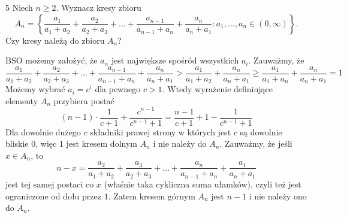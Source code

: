 \documentclass{../note}
\begin{document}
\begin{zadanie}{5}
Niech $n \ge 2$. Wyznacz kresy zbioru
\[ A_{n} = \left\{\frac{a_{1}}{a_{1}+a_{2}} + \frac{a_{2}}{a_{2}+a_{3}} + \dots + \frac{a_{n-1}}{a_{n-1}+a_{n}} + \frac{a_{n}}{a_{n}+a_{1}} : a_{1}, \dots, a_{n} \in (0,\infty)\right\}. \]
Czy kresy należą do zbioru $A_{n}$?
\end{zadanie}
\begin{rozwiazanie}
BSO możemy założyć, że $a_n$ jest największe spośród wszystkich $a_i$. Zauważmy, że 
\[\frac{a_{1}}{a_{1}+a_{2}} + \frac{a_{2}}{a_{2}+a_{3}} + \dots + \frac{a_{n-1}}{a_{n-1}+a_{n}} + \frac{a_{n}}{a_{n}+a_{1}} > \frac{a_{1}}{a_{1}+a_{2}} + \frac{a_{n}}{a_{n}+a_{1}} \geq \frac{a_{1}}{a_{1}+a_{n}} + \frac{a_{n}}{a_{n}+a_{1}} = 1\]
Możemy wybrać $a_i = c^i$ dla pewnego $c > 1$. Wtedy wyrażenie definiujące elementy $A_n$ przybiera postać
\[(n-1) \cdot \frac1{c+1} + \frac{c^{n-1}}{c^{n-1} + 1} = \frac{n-1}{c+1} + 1 - \frac{1}{c^{n-1} + 1}\]
Dla dowolnie dużego $c$ składniki prawej strony w których jest $c$ są dowolnie bliskie 0, więc $1$ jest kresem dolnym $A_n$ i nie należy do $A_n$. Zauważmy, że jeśli $x \in A_n$, to 
\[n-x = \frac{a_{2}}{a_{1}+a_{2}} + \frac{a_{3}}{a_{2}+a_{3}} + \dots + \frac{a_{n}}{a_{n-1}+a_{n}} + \frac{a_{1}}{a_{n}+a_{1}}\]
jest tej samej postaci co $x$ (właśnie taka cykliczna suma ułamków), czyli też jest ograniczone od dołu przez $1$. Zatem kresem górnym $A_n$ jest $n-1$ i nie należy ono do $A_n$.
\end{rozwiazanie}
\end{document}

